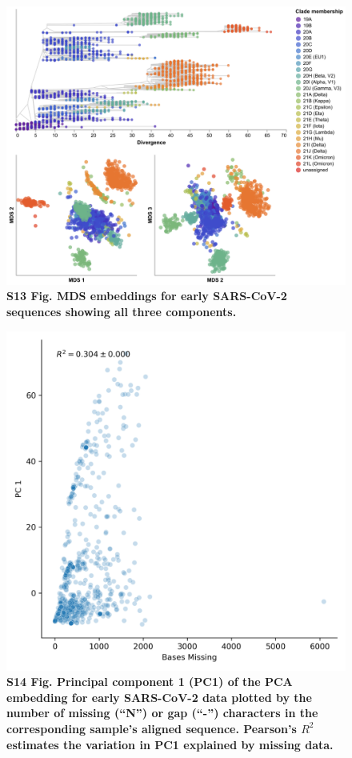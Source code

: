 \documentclass[10pt,letterpaper]{article}
\begin{document}
\begin{figure}[!h]
\includegraphics[width=\columnwidth]{figures/sarscov2-mds-by-Nextstrain_clade-clade.png}
\caption*{{\bf S13 Fig. MDS embeddings for early SARS-CoV-2 sequences showing all three components.}}
\end{figure}

\begin{figure}[!h]
\includegraphics[width=\columnwidth]{figures/sarscov2-pc1-vs-bases-missing.png}
\caption*{{\bf S14 Fig. Principal component 1 (PC1) of the PCA embedding for early SARS-CoV-2 data plotted by the number of missing (``N'') or gap (``-'') characters in the corresponding sample's aligned sequence. Pearson's $R^{2}$ estimates the variation in PC1 explained by missing data.}}
\end{figure}
\end{document}
